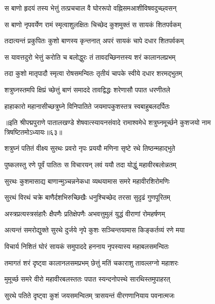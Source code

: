 \twolineshloka
{स बाणो हृदयं तस्य भेत्तुं तत्प्रचचाल वै}
{घोररूपो वह्निसमआशीविषवदुच्छ्वसन्}%

\twolineshloka
{स बाणो नृपवर्येण रामं स्मृत्वाशुलक्षितः}
{चिच्छेद कुशमुक्तं स सायकं शितपर्वकम्}%

\twolineshloka
{तदात्यन्तं प्रकुपितः कुशो बाणस्य कृन्तनात्}
{अपरं सायकं चापे दधार शितपर्वकम्}%

\twolineshloka
{स यावत्तदुरो भेत्तुं करोति च बलोद्धुरः}
{तं तावदच्छिनत्तस्य शरं कालानलप्रभम्}%

\twolineshloka
{तदा कुशो मातृपादौ स्मृत्वा रोषसमन्वितः}
{तृतीयं चापके स्वीये दधार शरमद्भुतम्}%

\twolineshloka
{शत्रुघ्नस्तमपि क्षिप्रं च्छेत्तुं बाणं समाददे}
{तावद्विद्धः शरेणासौ पपात धरणीतले}%

\twolineshloka
{हाहाकारो महानासीच्छत्रुघ्ने विनिपातिते}
{जयमापकुशस्तत्र स्वबाहुबलदर्पितः}%

॥इति श्रीपद्मपुराणे पातालखण्डे शेषवात्स्यायनसंवादे रामाश्वमेधे शत्रुघ्नमूर्च्छने कुशजयो नाम त्रिषष्टितमोऽध्यायः॥६३॥



\twolineshloka
{शत्रुघ्नं पतितं वीक्ष्य सुरथः प्रवरो नृपः}
{प्रययौ मणिना सृष्टे रथे तिष्ठन्महाद्भुते}%

\twolineshloka
{पुष्कलस्तु रणे पूर्वं पातितः स विचारयन्}
{लवं ययौ तदा योद्धुं महावीरबलोन्नतम्}%

\twolineshloka
{सुरथः कुशमासाद्य बाणान्मुञ्चन्ननेकधा}
{व्यथयामास समरे महावीरशिरोमणिः}%

\twolineshloka
{सुरथं विरथं चक्रे बाणैर्दशभिरुच्छिखैः}
{धनुश्चिच्छेद तरसा सुदृढं गुणपूरितम्}%

\twolineshloka
{अस्त्रप्रत्यस्त्रसंहारैः क्षैपणैः प्रतिक्षेपणैः}
{अभवत्तुमुलं युद्धं वीराणां रोमहर्षणम्}%

\twolineshloka
{अत्यन्तं समरोद्युक्ते सुरथे दुर्जये नृपे}
{कुशः सञ्चिन्तयामास किङ्कर्तव्यं रणे मया}%

\twolineshloka
{विचार्य निशितं घोरं सायकं समुपाददे}
{हननाय नृपस्यास्य महाबलसमन्वितः}%

\twolineshloka
{तमागतं शरं दृष्ट्वा कालानलसमप्रभम्}
{छेत्तुं मतिं चकाराशु तावल्लग्नो महाशरः}%

\twolineshloka
{मुमूर्च्छ समरे वीरो महावीरबलस्ततः}
{पपात स्यन्दनोपस्थे सारथिस्तमुपाहरत्}%

\twolineshloka
{सुरथे पतिते दृष्ट्वा कुशं जयसमन्वितम्}
{त्रासयन्तं वीरगणानियाय पवनात्मजः}%

